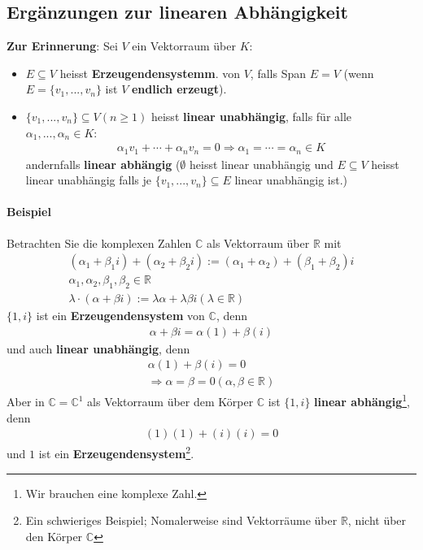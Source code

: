\documentclass[11pt]{report}
\newcommand*\Zb[1] {\mathbb{#1}}
\newcommand*\f[1] {\textbf{#1}}
\begin{document}
\subsection{Ergänzungen zur linearen Abhängigkeit}
\f{Zur Erinnerung}: Sei $V$ ein Vektorraum über $K$:
\begin{itemize}
 \item $E \subseteq V$ heisst \f{Erzeugendensystemm}. von $V$, falls Span $E = V$ (wenn $E = \{v_1, ..., v_n\}$ ist $V$ \f{endlich erzeugt}).
 \item $\{v_1, ..., v_n\} \subseteq V (n\geq 1)$ heisst \f{linear unabhängig}, falls für alle $\alpha_1, ..., \alpha_n \in K$:
\begin{align}
 \alpha_1 v_1 + \cdots + \alpha_n v_n = 0 \Rightarrow \alpha_1 = \cdots = \alpha_n \in K
\end{align}
andernfalls \f{linear abhängig} ($\emptyset$ heisst linear unabhängig und $E \subseteq V$ heisst linear unabhängig falls je $\{v_1, ..., v_n\} \subseteq E$ linear unabhängig ist.)
\end{itemize}

\paragraph{Beispiel}
Betrachten Sie die komplexen Zahlen $\Zb{C}$ als Vektorraum über $\Zb{R}$ mit
\begin{align}
 (\alpha_1 + \beta_1 i) + (\alpha_2 + \beta_2 i) := (\alpha_1 + \alpha_2) + (\beta_1 + \beta_2)i \\
 \alpha_1, \alpha_2, \beta_1, \beta_2 \in \Zb{R} \\
\lambda \cdot (\alpha + \beta i) := \lambda \alpha + \lambda \beta i (\lambda \in \Zb{R})
\end{align}
$\{1, i\}$ ist ein \f{Erzeugendensystem} von $\Zb{C}$, denn
\begin{align}
\alpha + \beta i = \alpha(1) + \beta(i) 
\end{align}
und auch \f{linear unabhängig}, denn
\begin{align}
 \alpha(1) + \beta(i) = 0 \\
\Rightarrow \alpha = \beta = 0 (\alpha, \beta \in \Zb{R})
\end{align}
Aber in $\Zb{C} = \Zb{C}^1$ als Vektorraum über dem Körper $\Zb{C}$ ist $\{1, i\}$ \f{linear abhängig}\footnote{Wir brauchen eine komplexe Zahl.}, denn
\begin{align}
 (1)(1) + (i)(i) = 0
\end{align}
und ${1}$ ist ein \f{Erzeugendensystem}\footnote{Ein schwieriges Beispiel; Nomalerweise sind Vektorräume über $\Zb{R}$, nicht über den Körper $\Zb{C}$}.
\end{document}
